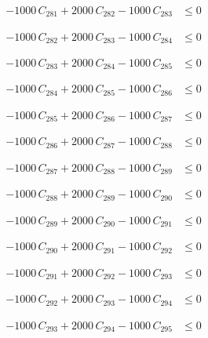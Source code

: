 \documentclass[a4paper,11pt]{article}
\begin{document}
\begin{align}
-1000\,C_{281} + 2000\,C_{282} - 1000\,C_{283} &\leq 0 \nonumber
\end{align}

\begin{align}
-1000\,C_{282} + 2000\,C_{283} - 1000\,C_{284} &\leq 0 \nonumber
\end{align}

\begin{align}
-1000\,C_{283} + 2000\,C_{284} - 1000\,C_{285} &\leq 0 \nonumber
\end{align}

\begin{align}
-1000\,C_{284} + 2000\,C_{285} - 1000\,C_{286} &\leq 0 \nonumber
\end{align}

\begin{align}
-1000\,C_{285} + 2000\,C_{286} - 1000\,C_{287} &\leq 0 \nonumber
\end{align}

\begin{align}
-1000\,C_{286} + 2000\,C_{287} - 1000\,C_{288} &\leq 0 \nonumber
\end{align}

\begin{align}
-1000\,C_{287} + 2000\,C_{288} - 1000\,C_{289} &\leq 0 \nonumber
\end{align}

\begin{align}
-1000\,C_{288} + 2000\,C_{289} - 1000\,C_{290} &\leq 0 \nonumber
\end{align}

\begin{align}
-1000\,C_{289} + 2000\,C_{290} - 1000\,C_{291} &\leq 0 \nonumber
\end{align}

\begin{align}
-1000\,C_{290} + 2000\,C_{291} - 1000\,C_{292} &\leq 0 \nonumber
\end{align}

\begin{align}
-1000\,C_{291} + 2000\,C_{292} - 1000\,C_{293} &\leq 0 \nonumber
\end{align}

\begin{align}
-1000\,C_{292} + 2000\,C_{293} - 1000\,C_{294} &\leq 0 \nonumber
\end{align}

\begin{align}
-1000\,C_{293} + 2000\,C_{294} - 1000\,C_{295} &\leq 0 \nonumber
\end{align}
\end{document}
